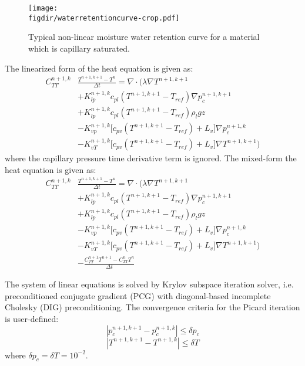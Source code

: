 \begin{figure}[t]
	\centering
	\texttt{[image: \\figdir/waterretentioncurve-crop.pdf]}
	\caption{Typical non-linear moisture water retention curve for a material which is capillary saturated.}
	\label{fig:wrc}
\end{figure}

The linearized form of the heat equation is given as:
\begin{equation}
\begin{split}
	C_{\textit{TT}}^{n+1,k}& \frac{T^{n+1,k+1}-T^{n}}{\Delta t} = \nabla \cdot \bigg(\lambda \nabla T^{n+1,k+1} \\
	&+ K_{\textit{lp}}^{n+1,k} c_{\textit{pl}} \left(T^{n+1,k+1} - T_{\textit{ref}}\right)  \nabla p_c^{n+1,k+1} \\
	&+ K_{\textit{lp}}^{n+1,k} c_{\textit{pl}} \left(T^{n+1,k+1} - T_{\textit{ref}}\right) \rho_l g z\\
	&- K_{\textit{vp}}^{n+1,k} \Big[c_{\textit{pv}} \left(T^{n+1,k+1} - T_{\textit{ref}}\right) + L_v\Big] \nabla p_c^{n+1,k} \\ 
	&- K_{\textit{vT}}^{n+1,k} \Big[c_{\textit{pv}} \left(T^{n+1,k+1} - T_{\textit{ref}}\right) + L_v\Big] \nabla T^{n+1,k+1} \bigg)
\end{split}
\end{equation}
where the capillary pressure time derivative term is ignored. The mixed-form the heat equation is given as:
\begin{equation}
\begin{split}
C_{\textit{TT}}^{n+1,k}&\frac{T^{n+1,k+1}-T^{n}}{\Delta t} = \nabla \cdot \bigg(\lambda \nabla T^{n+1,k+1} \\
&+ K_{\textit{lp}}^{n+1,k} c_{\textit{pl}} \left(T^{n+1,k+1} - T_{\textit{ref}}\right)  \nabla p_c^{n+1,k+1} \\
&+ K_{\textit{lp}}^{n+1,k} c_{\textit{pl}} \left(T^{n+1,k+1} - T_{\textit{ref}}\right) \rho_l g z\\
&- K_{\textit{vp}}^{n+1,k} \Big[c_{\textit{pv}} \left(T^{n+1,k+1} - T_{\textit{ref}}\right) + L_v\Big] \nabla p_c^{n+1,k} \\
&- K_{\textit{vT}}^{n+1,k} \Big[c_{\textit{pv}} \left(T^{n+1,k+1} - T_{\textit{ref}}\right) + L_v\Big] \nabla T^{n+1,k+1} \bigg)\\
&- \frac{C_{TT}^{n+1}T^{n+1} - C_{TT}^{n}T^{n}}{\Delta t}
\end{split}
\end{equation}


The system of linear equations is solved by Krylov subspace iteration solver, i.e. preconditioned conjugate gradient (PCG) with diagonal-based incomplete Cholesky (DIG) preconditioning. The convergence criteria for the Picard iteration is user-defined: 
\begin{equation}
\left| p_c^{n+1,k+1} - p_c^{n+1,k}\right| \le \delta p_c
\end{equation}
\begin{equation}
\left| T^{n+1,k+1} - T^{n+1,k}\right| \le \delta T
\end{equation}
where $\delta p_c = \delta T = 10^{-2}$.

